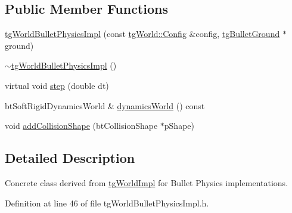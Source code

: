 \subsection*{Public Member Functions}
\begin{DoxyCompactItemize}
\item 
\hyperlink{classtg_world_bullet_physics_impl_a5d580bbb1e01cda639cc913f7afb4e32}{tg\-World\-Bullet\-Physics\-Impl} (const \hyperlink{structtg_world_1_1_config}{tg\-World\-::\-Config} \&config, \hyperlink{classtg_bullet_ground}{tg\-Bullet\-Ground} $\ast$ground)
\item 
\hyperlink{classtg_world_bullet_physics_impl_a911e342b4d323524f045760c9b24780f}{$\sim$tg\-World\-Bullet\-Physics\-Impl} ()
\item 
virtual void \hyperlink{classtg_world_bullet_physics_impl_a7b1ae320bea710dced04f03222644f1e}{step} (double dt)
\item 
bt\-Soft\-Rigid\-Dynamics\-World \& \hyperlink{classtg_world_bullet_physics_impl_ae82f851ae223956a60e425d7e88cf1bc}{dynamics\-World} () const 
\item 
void \hyperlink{classtg_world_bullet_physics_impl_a8d9da0d41c6ff4e38788a39ea8183c42}{add\-Collision\-Shape} (bt\-Collision\-Shape $\ast$p\-Shape)
\end{DoxyCompactItemize}


\subsection{Detailed Description}
Concrete class derived from \hyperlink{classtg_world_impl}{tg\-World\-Impl} for Bullet Physics implementations. 

Definition at line 46 of file tg\-World\-Bullet\-Physics\-Impl.\-h.



